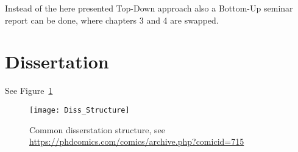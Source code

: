 Instead of the here presented Top-Down approach also a Bottom-Up seminar report can be done, where chapters 3 and 4 are swapped.

\section{Dissertation}
\label{sec:structure:dissertation}
See Figure~\ref{fig:diss_structure}

\begin{figure}
    \begin{center}
      \texttt{[image: Diss\_Structure]}
      \caption{Common disserstation structure, see \url{https://phdcomics.com/comics/archive.php?comicid=715}}
      \label{fig:diss_structure}
    \end{center}
  \end{figure}


